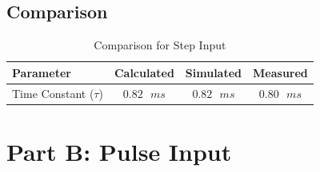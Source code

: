 \documentclass[12pt, a4paper]{article}
\begin{document}
\subsection{Comparison}
\begin{table}[H]
    \centering
    \begin{tabular}{lccc}
        \toprule
        Parameter & Calculated & Simulated & Measured \\
        \midrule
        Time Constant ($\tau$) & $0.82\text{ } ms$ & $0.82 \text{ }ms$ & $0.80\text{ }ms$ \\
        \bottomrule
    \end{tabular}
    \caption{Comparison for Step Input}
\end{table}

\section{Part B: Pulse Input}
\end{document}
